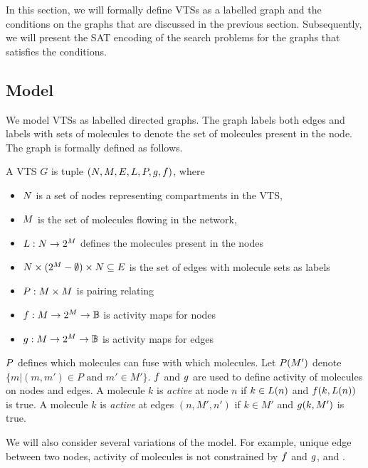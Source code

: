 In this section, we will formally define VTSs as a labelled graph
and the conditions on the graphs that are discussed in the previous
section.
Subsequently, we will present the SAT encoding of the search problems
for the graphs that satisfies the conditions.

\subsection{Model}

We model VTSs as labelled directed graphs.
The graph labels both edges and labels with sets of molecules to denote
the set of molecules present in the node.
The graph is formally defined as follows.

\begin{df}
  A VTS $G$ is tuple $(N,M,E,L,P,g,f)$, where
  \begin{itemize}
  \item $N$ is a set of nodes representing compartments in the VTS,
  \item $M$ is the set of molecules flowing in the network, 
  \item $L : N \rightarrow 2^{M}$ defines the molecules present in the nodes  
  \item $ N \times (2^{M}-\emptyset) \times N \subseteq E$ is the set of edges
    with molecule sets as labels
  \item $P : M \times M$ is pairing relating
  \item $f : M \rightarrow 2^{M} \rightarrow \mathbb{B}$ is activity maps for nodes
  \item $g : M \rightarrow 2^{M} \rightarrow \mathbb{B} $ is activity maps for edges
  \end{itemize}
\end{df}
$P$ defines which molecules can fuse with which molecules.
%
Let $P(M')$ denote $\{m|(m,m') \in P \text{ and } m' \in M'\}$.
%
$f$ and $g$ are used to define activity of molecules on
nodes and edges.
%
A molecule $k$ is {\em active} at node $n$ if $k \in L(n)$ and
$f(k,L(n))$ is true.
%
A molecule $k$ is {\em active} at edges $(n,M',n')$ if $k \in M'$ and
$g(k,M')$ is true.

We will also consider several variations of the model.
%
For example, unique edge between two nodes, activity of molecules is
not constrained by $f$ and $g$, and .
%

